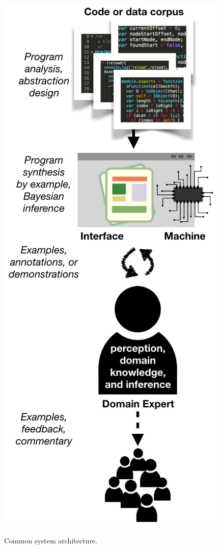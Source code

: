 \documentclass[justified]{tufte-handout}
\begin{document}
\begin{marginfigure}
  \includegraphics[width=0.75\linewidth]{Summary_figure2.png}
  \caption{Common system architecture.}
  \label{fig:summaryfig2}
\end{marginfigure}
\end{document}
